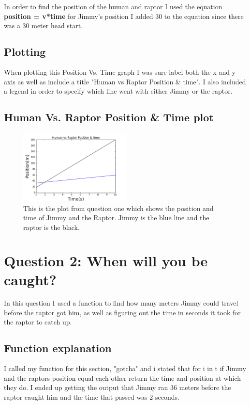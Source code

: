 \documentclass[twocolumn]{revtex4}
\begin{document}
In order to find the position of the human and raptor I used the equation \textbf{position = v*time} for Jimmy's position I added 30 to the equation since there was a 30 meter head start. 

\subsection{Plotting}
When plotting this Position Vs. Time graph I was sure label both the x and y axis as well as include a title "Human vs Raptor Position \& time". I also included a legend in order to specify which line went with either Jimmy or the raptor.


\subsection{Human Vs. Raptor Position \& Time plot}
\begin{figure}
\includegraphics[width=0.5\textwidth]{Jimmy_Graph.png}
\caption {This is the plot from question one which shows the 	position and time of Jimmy and the Raptor. Jimmy is the blue line and the raptor is the black.}
\label{fig:Position vs. Time}
\end{figure}


\section{Question 2: When will you be caught?}

In this question I used a function to find how many meters Jimmy could travel before the raptor got him, as well as figuring out the time in seconds it took for the raptor to catch up. 

\subsection{Function explanation}

I called my function for this section, "gotcha" and i stated that for i in t if Jimmy and the raptors position equal each other return the time and position at which they do. I ended up getting the output that Jimmy ran 36 meters before the raptor caught him and the time that passed was 2 seconds. 
\end{document}
